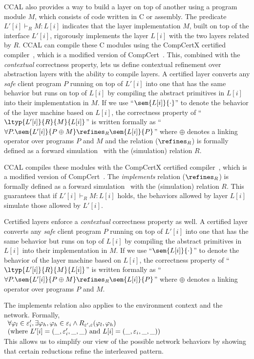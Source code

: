 CCAL also provides a way to build a layer on top of another using a program module $M$, which consists of code written in C or assembly.
The predicate $L'[i] \vdash_R  M : L[i]$ indicates that the layer implementation $M$, built on top of the interface $L'[i]$, rigorously implements
the layer $L[i]$ with the two layers related by $R$.
CCAL can compile these C modules using the CompCertX certified compiler~\cite{deepspec, concurrency},
which is a modified version of CompCert~\cite{compcert}.
This, combined with the {\em contextual} correctness property,
lets us define contextual refinement over abstraction layers with the ability to compile layers.
A certified layer converts any {\em safe} client program $P$ running on top of $L'[i]$ into one that has the
same behavior but runs on top of $L[i]$ by compiling the abstract
primitives in $L[i]$ into their implementation in $M$.
If we use ``$\sem{L[i]}{\cdot}$'' to denote the behavior of the layer machine based on
$L[i]$, the correctness property of ``$\ltyp{L'[i]}{R}{M}{L[i]}$'' is written
formally as ``$\forall{}P.\sem{L'[i]}{P\oplus{}M} \refines_R \sem{L[i]}{P}$''
where $\oplus$ denotes a linking operator over programs $P$ and $M$ and 
the relation ($\refines_R$) is formally defined as a forward
simulation~\cite{Lynch95,leroy09,Milner71,Park81} with the (simulation) relation $R$.

CCAL compiles these modules with the CompCertX certified compiler~\cite{deepspec, concurrency},
which is a modified version of CompCert~\cite{deepspec, compcert}.
The {\em implements} relation ($\refines_R$) is formally defined as a forward
simulation~\cite{Lynch95,leroy09,Milner71,Park81} with the (simulation) relation $R$.
This guarantees that if $L'[i] \vdash_R  M : L[i]$ holds,
the behaviors allowed by layer $L[i]$ simulate those allowed by $L'[i]$.

Certified layers enforce a {\em contextual} correctness property as well.
A certified layer converts any {\em safe} client program $P$ running on top of $L'[i]$ into one that has the
same behavior but runs on top of $L[i]$ by compiling the abstract
primitives in $L[i]$ into their implementation in $M$.
If we use ``$\sem{L[i]}{\cdot}$'' to denote the behavior of the layer machine based on
$L[i]$, the correctness property of ``$\ltyp{L'[i]}{R}{M}{L[i]}$'' is written
formally as ``$\forall{}P.\sem{L'[i]}{P\oplus{}M} \refines_R \sem{L[i]}{P}$''
where $\oplus$ denotes a linking operator over programs $P$ and $M$.

The implements relation also applies to the environment context and the network.
Formally,\\
$\begin{array}{l}
\forall \varphi_l \in \envcontext'_i, \exists \varphi_h,  \varphi_h \in \envcontext_i \wedge R_{\envcontext', \envcontext}(\varphi_l , \varphi_h) \\
\hfill (\mbox{where} \ L'[i] = (\_,  \envcontext'_i, \_, \_) \ \mbox{and} \ L[i] = (\_,  \envcontext_i, \_, \_))
\end{array}
$\\
This allows us to simplify our view of the possible network behaviors by showing that certain reductions refine the interleaved pattern.


